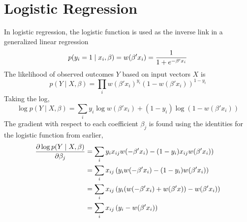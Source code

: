 \documentclass[11pt]{article}
\begin{document}
\section{Logistic Regression}
In logistic regression, the logistic function is used as the inverse link in a generalized linear regression
\begin{equation*}
p(y_i = 1 \mid x_i, \beta) =w(\beta' x_i)= {1 \over 1+e^{-\beta' x_i}}
\end{equation*}
The likelihood of observed outcomes $Y$ based on input vectors $X$ is
\begin{equation*}
 p(Y \mid X, \beta) = \prod_i w(\beta' x_i)^{y_i} (1-w(\beta' x_i))^{1-y_i}
\end{equation*}
Taking the log,
\begin{equation*}
\log p(Y \mid X, \beta) = \sum_i y_i \log w(\beta' x_i) + (1-y_i) \log (1-w(\beta' x_i))
\end{equation*}
The gradient with respect to each coefficient $\beta_j$ is found using the identities for the logistic function from earlier,
\begin{align*}
{\partial \log p(Y \mid X, \beta) \over \partial \beta_j} &= \sum_i y_i { x_{ij} w(-\beta' x_i)} - (1-y_i) x_{ij} w(\beta' x_i))  \\
&=\sum_i x_{ij} \left(y_i  w(-\beta' x_i) - (1-y_i)  w(\beta' x_i) \right) \\
&=\sum_i x_{ij} \left(y_i ( w(-\beta' x_i)+w(\beta' x)) -   w(\beta' x_i) \right) \\
&=\sum_i x_{ij} \left(y_i  -   w(\beta' x_i) \right) \\
\end{align*}
\end{document}

